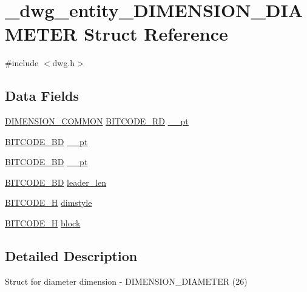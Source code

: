 \hypertarget{struct__dwg__entity__DIMENSION__DIAMETER}{\section{\-\_\-dwg\-\_\-entity\-\_\-\-D\-I\-M\-E\-N\-S\-I\-O\-N\-\_\-\-D\-I\-A\-M\-E\-T\-E\-R \-Struct \-Reference}
\label{struct__dwg__entity__DIMENSION__DIAMETER}
}


{\ttfamily \#include $<$dwg.\-h$>$}

\subsection*{\-Data \-Fields}
\begin{DoxyCompactItemize}
\item 
\hyperlink{dwg_8h_a334d626d7e4a0a1af39036446dfa82c4}{\-D\-I\-M\-E\-N\-S\-I\-O\-N\-\_\-\-C\-O\-M\-M\-O\-N} \hyperlink{dwg_8h_a1d23a9bc9a02453876b244dc6706f6a6}{\-B\-I\-T\-C\-O\-D\-E\-\_\-R\-D} \hyperlink{struct__dwg__entity__DIMENSION__DIAMETER_aab6ae628c9865e5bee66e5c362bfa6b6}{\-\_\-\_\-pt}
\item 
\hyperlink{dwg_8h_a00698ef1bb072aa0a9360c6fc1c57587}{\-B\-I\-T\-C\-O\-D\-E\-\_\-B\-D} \hyperlink{struct__dwg__entity__DIMENSION__DIAMETER_a1d5e6b81964e25b716c51618d10d0035}{\-\_\-\_\-pt}
\item 
\hyperlink{dwg_8h_a00698ef1bb072aa0a9360c6fc1c57587}{\-B\-I\-T\-C\-O\-D\-E\-\_\-B\-D} \hyperlink{struct__dwg__entity__DIMENSION__DIAMETER_a25771dd544ad96261b46d282e2aba18b}{\-\_\-\_\-pt}
\item 
\hyperlink{dwg_8h_a3c1e6781466b74ba07785d57da70ed97}{\-B\-I\-T\-C\-O\-D\-E\-\_\-\-B\-D} \hyperlink{struct__dwg__entity__DIMENSION__DIAMETER_a4a6bb8e829d8ce02b678acf630ca5576}{leader\-\_\-len}
\item 
\hyperlink{dwg_8h_a7c700e94e047a97ba8c24bdfe4029dc3}{\-B\-I\-T\-C\-O\-D\-E\-\_\-\-H} \hyperlink{struct__dwg__entity__DIMENSION__DIAMETER_ae3a8433e1aa3b9ce9eb67eb87196057e}{dimstyle}
\item 
\hyperlink{dwg_8h_a7c700e94e047a97ba8c24bdfe4029dc3}{\-B\-I\-T\-C\-O\-D\-E\-\_\-\-H} \hyperlink{struct__dwg__entity__DIMENSION__DIAMETER_a3252e3dac90032e3c8e9dd6e2509acbe}{block}
\end{DoxyCompactItemize}


\subsection{\-Detailed \-Description}
\-Struct for diameter dimension -\/ \-D\-I\-M\-E\-N\-S\-I\-O\-N\-\_\-\-D\-I\-A\-M\-E\-T\-E\-R (26) 

